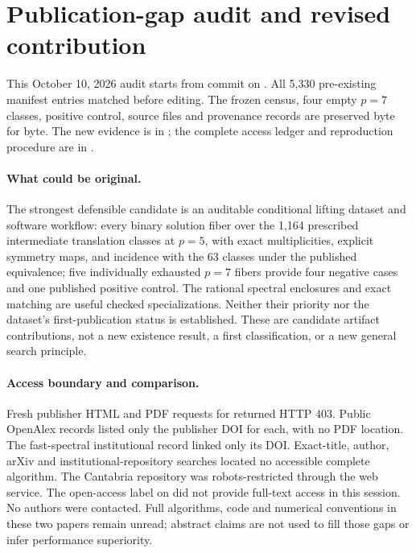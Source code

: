 \documentclass[11pt]{article}
\begin{document}

\section{Publication-gap audit and revised contribution}\label{sec:gap}
This October 10, 2026 audit starts from commit
 on
. All 5,330 pre-existing manifest entries
matched before editing. The frozen census, four empty $p=7$ classes, positive
control, source files and provenance records are preserved byte for byte.
The new evidence is in ; the complete
access ledger and reproduction procedure are in
.

\paragraph{What could be original.}
The strongest defensible candidate is an auditable conditional lifting
dataset and software workflow: every binary solution fiber over the 1,164
prescribed intermediate translation classes at $p=5$, with exact
multiplicities, explicit symmetry maps, and incidence with the 63 classes
under the published equivalence; five individually exhausted $p=7$ fibers
provide four negative cases and one published positive control. The rational
spectral enclosures and exact matching are useful checked specializations.
Neither their priority nor the dataset's first-publication status is
established. These are candidate artifact contributions, not a new existence
result, a first classification, or a new general search principle.

\paragraph{Access boundary and comparison.}
Fresh publisher HTML and PDF requests for \cite{perera,pq2} returned HTTP 403.
Public OpenAlex records listed only the publisher DOI for each, with no PDF
location. The fast-spectral institutional record linked only its DOI.
Exact-title, author, arXiv and institutional-repository searches located no
accessible complete algorithm. The Cantabria repository was robots-restricted
through the web service. The open-access label on \cite{pq2} did not provide
full-text access in this session. No authors were contacted. Full algorithms,
code and numerical conventions in these two papers remain unread; abstract
claims are not used to fill those gaps or infer performance superiority.
\end{document}
